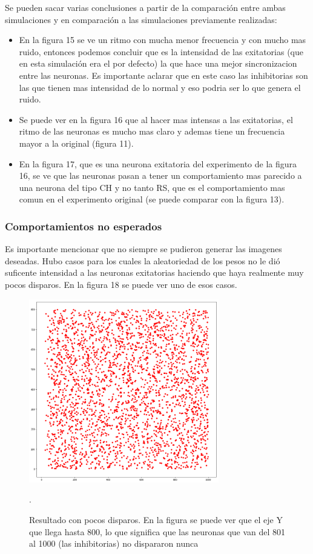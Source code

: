 \documentclass[12pt]{article}
\begin{document}
Se pueden sacar varias conclusiones a partir de la comparación entre ambas simulaciones y en comparación a las simulaciones previamente realizadas:
\begin{itemize}
    \item En la figura 15 se ve un ritmo con mucha menor frecuencia y con mucho mas ruido, entonces podemos concluir que es la intensidad de las exitatorias (que en esta simulación era el por defecto)
    la que hace una mejor sincronizacion entre las neuronas. Es importante aclarar que en este caso las inhibitorias son las que tienen mas intensidad de lo normal y eso podria ser lo que genera el ruido.
    \item Se puede ver en la figura 16 que al hacer mas intensas a las exitatorias, el ritmo de las neuronas es mucho mas claro y ademas tiene un frecuencia mayor a la original (figura 11).
    \item En la figura 17, que es una neurona exitatoria del experimento de la figura 16, se ve que las neuronas pasan a tener un comportamiento mas parecido a una neurona del tipo CH y no tanto RS, que es el comportamiento mas comun en el experimento original (se puede comparar con la figura 13).
\end{itemize}

\subsubsection{Comportamientos no esperados}
Es importante mencionar que no siempre se pudieron generar las imagenes deseadas. Hubo casos para los cuales la aleatoriedad de los pesos no le dió suficente intensidad a las neuronas exitatorias haciendo que haya realmente muy pocos disparos.
En la figura 18 se puede ver uno de esos casos.

\begin{figure}[htp!]
    \centering
        \includegraphics[height=8cm]{images/resultadoVacio.png}
    \caption[fontsize=2pt]{Resultado con pocos disparos. En la figura se puede ver que el eje Y que llega hasta 800, lo que significa que las neuronas que van del 801 al 1000 (las inhibitorias) no dispararon nunca}.
\end{figure}
\end{document}
